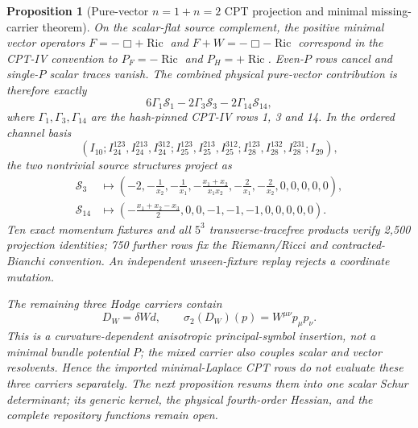 \documentclass[11pt]{article}
\newtheorem{proposition}[theorem]{Proposition}
\theoremstyle{definition}
\theoremstyle{remark}
\begin{document}
\begin{proposition}[Pure-vector $n=1+n=2$ CPT projection and minimal
missing-carrier theorem]
On the scalar-flat source complement, the positive minimal vector operators
$F=-\Box+\operatorname{Ric}$ and
$F+W=-\Box-\operatorname{Ric}$ correspond in the CPT-IV convention to
$P_F=-\operatorname{Ric}$ and $P_H=+\operatorname{Ric}$.  Even-$P$ rows cancel and single-$P$ scalar
traces vanish.  The combined physical pure-vector contribution is therefore
exactly
\[
  6\Gamma_1\mathcal S_1
  -2\Gamma_3\mathcal S_3
  -2\Gamma_{14}\mathcal S_{14},
\]
where $\Gamma_1,\Gamma_3,\Gamma_{14}$ are the hash-pinned CPT-IV rows 1, 3
and 14.  In the ordered channel basis
\[
 (I_{10};I_{24}^{123},I_{24}^{213},I_{24}^{312};
 I_{25}^{123},I_{25}^{213},I_{25}^{312};
 I_{28}^{123},I_{28}^{132},I_{28}^{231};I_{29}),
\]
the two nontrivial source structures project as
\begin{align*}
 \mathcal S_3&\longmapsto
 \left(-2,-\frac1{x_2},-\frac1{x_1},
 -\frac{x_1+x_2}{x_1x_2},-\frac2{x_1},-\frac2{x_2},0,0,0,0,0\right),\\
 \mathcal S_{14}&\longmapsto
 \left(-\frac{x_1+x_2-x_3}{2},0,0,-1,-1,-1,0,0,0,0,0\right).
\end{align*}
Ten exact momentum fixtures and all $5^3$ transverse-tracefree products
verify 2,500 projection identities; 750 further rows fix the Riemann/Ricci
and contracted-Bianchi convention.  An independent unseen-fixture replay
rejects a coordinate mutation.

The remaining three Hodge carriers contain
\[
 D_W=\delta Wd,
 \qquad \sigma_2(D_W)(p)=W^{\mu\nu}p_\mu p_\nu.
\]
This is a curvature-dependent anisotropic principal-symbol insertion, not a
minimal bundle potential $P$; the mixed carrier also couples scalar and
vector resolvents.  Hence the imported minimal-Laplace CPT rows do not
evaluate these three carriers separately.  The next proposition resums them
into one scalar Schur determinant; its generic kernel, the physical
fourth-order Hessian, and the complete repository functions remain open.
\end{proposition}
\end{document}
